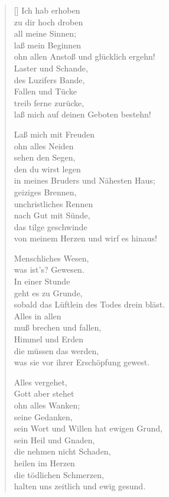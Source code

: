 \begin{multicols}{2}
\begin{verse}[\versewidth]
 Ich hab erhoben\\
zu dir hoch droben\\
all meine Sinnen;\\
laß mein Beginnen\\
ohn allen Anstoß und glücklich ergehn!\\
Laster und Schande,\\
des Luzifers Bande,\\
Fallen und Tücke\\
treib ferne zurücke,\\
laß mich auf deinen Geboten bestehn!

\vfill\null
\columnbreak

 Laß mich mit Freuden\\
ohn alles Neiden\\
sehen den Segen,\\
den du wirst legen\\
in meines Bruders und Nähesten Haus;\\
geiziges Brennen,\\
unchristliches Rennen\\
nach Gut mit Sünde,\\
das tilge geschwinde\\
von meinem Herzen und wirf es hinaus!

 Menschliches Wesen,\\
was ist's? Gewesen.\\
In einer Stunde\\
geht es zu Grunde,\\
sobald das Lüftlein des Todes drein bläst.\\
Alles in allen\\
muß brechen und fallen,\\
Himmel und Erden\\
die müssen das werden,\\
was sie vor ihrer Erschöpfung gewest.

 Alles vergehet,\\
Gott aber stehet\\
ohn alles Wanken;\\
seine Gedanken,\\
sein Wort und Willen hat ewigen Grund,\\
sein Heil und Gnaden,\\
die nehmen nicht Schaden,\\
heilen im Herzen\\
die tödlichen Schmerzen,\\
halten uns zeitlich und ewig gesund.


\end{verse}
\end{multicols}
